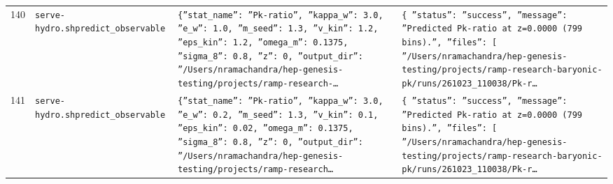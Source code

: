 \documentclass[11pt,a4paper]{article}
\begin{document}
\begin{longtable}{@{}p{}p{}p{}p{}@{}}
140 & \texttt{serve-hydro.sh}\newline\texttt{predict\_\allowbreak{}observable} & \texttt{\{''stat\_\allowbreak{}name'':\allowbreak{} ''Pk-ratio'',\allowbreak{} ''kappa\_\allowbreak{}w'':\allowbreak{} 3.0,\allowbreak{} ''e\_\allowbreak{}w'':\allowbreak{} 1.0,\allowbreak{} ''m\_\allowbreak{}seed'':\allowbreak{} 1.3,\allowbreak{} ''v\_\allowbreak{}kin'':\allowbreak{} 1.2,\allowbreak{} ''eps\_\allowbreak{}kin'':\allowbreak{} 1.2,\allowbreak{} ''omega\_\allowbreak{}m'':\allowbreak{} 0.1375,\allowbreak{} ''sigma\_\allowbreak{}8'':\allowbreak{} 0.8,\allowbreak{} ''z'':\allowbreak{} 0,\allowbreak{} ''output\_\allowbreak{}dir'':\allowbreak{} ''/\allowbreak{}Users/\allowbreak{}nramachandra/\allowbreak{}hep-genesis-testing/\allowbreak{}projects/\allowbreak{}ramp-research-\ldots{}\allowbreak{}} & \texttt{\{   ''status'':\allowbreak{} ''success'',\allowbreak{}   ''message'':\allowbreak{} ''Predicted Pk-ratio at z=\allowbreak{}0.0000 (799 bins)\allowbreak{}.'',\allowbreak{}   ''files'':\allowbreak{} [     ''/\allowbreak{}Users/\allowbreak{}nramachandra/\allowbreak{}hep-genesis-testing/\allowbreak{}projects/\allowbreak{}ramp-research-baryonic-pk/\allowbreak{}runs/\allowbreak{}261023\_\allowbreak{}110038/\allowbreak{}Pk-r\ldots{}\allowbreak{}} \\
141 & \texttt{serve-hydro.sh}\newline\texttt{predict\_\allowbreak{}observable} & \texttt{\{''stat\_\allowbreak{}name'':\allowbreak{} ''Pk-ratio'',\allowbreak{} ''kappa\_\allowbreak{}w'':\allowbreak{} 3.0,\allowbreak{} ''e\_\allowbreak{}w'':\allowbreak{} 0.2,\allowbreak{} ''m\_\allowbreak{}seed'':\allowbreak{} 1.3,\allowbreak{} ''v\_\allowbreak{}kin'':\allowbreak{} 0.1,\allowbreak{} ''eps\_\allowbreak{}kin'':\allowbreak{} 0.02,\allowbreak{} ''omega\_\allowbreak{}m'':\allowbreak{} 0.1375,\allowbreak{} ''sigma\_\allowbreak{}8'':\allowbreak{} 0.8,\allowbreak{} ''z'':\allowbreak{} 0,\allowbreak{} ''output\_\allowbreak{}dir'':\allowbreak{} ''/\allowbreak{}Users/\allowbreak{}nramachandra/\allowbreak{}hep-genesis-testing/\allowbreak{}projects/\allowbreak{}ramp-research\ldots{}\allowbreak{}} & \texttt{\{   ''status'':\allowbreak{} ''success'',\allowbreak{}   ''message'':\allowbreak{} ''Predicted Pk-ratio at z=\allowbreak{}0.0000 (799 bins)\allowbreak{}.'',\allowbreak{}   ''files'':\allowbreak{} [     ''/\allowbreak{}Users/\allowbreak{}nramachandra/\allowbreak{}hep-genesis-testing/\allowbreak{}projects/\allowbreak{}ramp-research-baryonic-pk/\allowbreak{}runs/\allowbreak{}261023\_\allowbreak{}110038/\allowbreak{}Pk-r\ldots{}\allowbreak{}} \\

\end{longtable}
\end{document}
